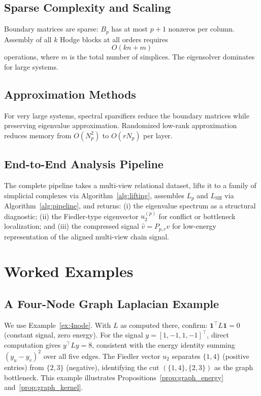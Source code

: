 \documentclass[11pt]{article}
\theoremstyle{definition}
\theoremstyle{remark}
\begin{document}
\subsection{Sparse Complexity and Scaling}

Boundary matrices are sparse: $B_p$ has at most $p+1$ nonzeros per column.
Assembly of all $k$ Hodge blocks at all orders requires
\[
  O(kn + m)
\]
operations, where $m$ is the total number of simplices. The eigensolver dominates
for large systems.

\subsection{Approximation Methods}

For very large systems, spectral sparsifiers reduce the boundary matrices while
preserving eigenvalue approximation. Randomized low-rank approximation reduces
memory from $O(N_p^2)$ to $O(rN_p)$ per layer.

\subsection{End-to-End Analysis Pipeline}

The complete pipeline takes a multi-view relational dataset, lifts it to a family of simplicial complexes via Algorithm~\ref{alg:lifting}, assembles $L_p$ and $L_{\mathrm{SH}}$ via Algorithm~\ref{alg:pipeline}, and returns: (i) the eigenvalue spectrum as a structural diagnostic; (ii) the Fiedler-type eigenvector $u^{(p)}_2$ for conflict or bottleneck localization; and (iii) the compressed signal $\hat{v} = P_{p,r}v$ for low-energy representation of the aligned multi-view chain signal.


\section{Worked Examples}
\label{sec:examples}

\subsection{A Four-Node Graph Laplacian Example}

We use Example~\ref{ex:4node}. With $L$ as computed there, confirm:
$\mathbf{1}^\top L\mathbf{1}=0$ (constant signal, zero energy). For the signal
$y=[1,-1,1,-1]^\top$, direct computation gives $y^\top Ly = 8$, consistent
with the energy identity summing $(y_u-y_v)^2$ over all five edges. The Fiedler
vector $u_2$ separates $\{1,4\}$ (positive entries) from $\{2,3\}$ (negative),
identifying the cut $(\{1,4\},\{2,3\})$ as the graph bottleneck. This example
illustrates Propositions~\ref{prop:graph_energy} and~\ref{prop:graph_kernel}.
\end{document}
